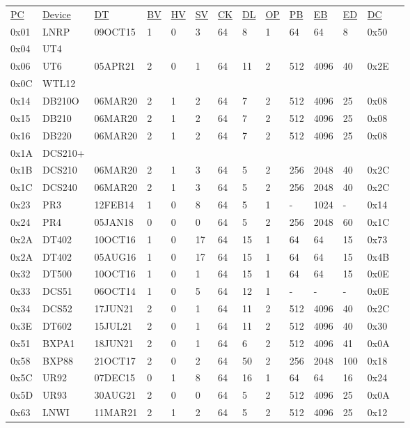 \begin{tabular}{l l l l l l l l l l l l l l}
\underline{PC} & \underline{Device} & \underline{DT} & \underline{BV} & \underline{HV} & \underline{SV} & \underline{CK} & \underline{DL} & \underline{OP} & \underline{PB} & \underline{EB} & \underline{ED} & \underline{DC}\\
0x01 & LNRP & 09OCT15 & 1 & 0 & 3 & 64 & 8 & 1 & 64 & 64 & 8 & 0x50\\
0x04 & UT4\\
0x06 & UT6 & 05APR21 & 2 & 0 & 1 & 64 & 11 & 2 & 512 & 4096 & 40 & 0x2E\\
0x0C & WTL12\\
0x14 & DB210O & 06MAR20 & 2 & 1 & 2 & 64 & 7 & 2 & 512 & 4096 & 25 & 0x08\\
0x15 & DB210 & 06MAR20& 2 & 1 & 2 & 64 & 7 & 2 & 512 & 4096 & 25 & 0x08\\
0x16 & DB220 & 06MAR20 & 2 & 1 & 2 & 64 & 7 & 2 & 512 & 4096 & 25 & 0x08\\
0x1A & DCS210+\\
0x1B & DCS210 & 06MAR20 & 2 & 1 & 3 & 64 & 5 & 2 & 256 & 2048 & 40 & 0x2C\\
0x1C & DCS240 & 06MAR20 & 2 & 1 & 3 & 64 & 5 & 2 & 256 & 2048 & 40 & 0x2C\\
0x23 & PR3 & 12FEB14 & 1 & 0 & 8 & 64 & 5 & 1 & - & 1024 & - & 0x14\\
0x24 & PR4 & 05JAN18 & 0 & 0 & 0 & 64 & 5 & 2 & 256 & 2048 & 60 & 0x1C\\
0x2A & DT402 & 10OCT16 & 1 & 0 & 17 & 64 & 15 & 1 & 64 & 64 & 15 & 0x73\\
0x2A & DT402 & 05AUG16 & 1 & 0 & 17 & 64 & 15 & 1 & 64 & 64 & 15 & 0x4B\\
0x32 & DT500 & 10OCT16 & 1 & 0 & 1 & 64 & 15 & 1 & 64 & 64 & 15 & 0x0E\\
0x33 & DCS51 & 06OCT14 & 1 & 0 & 5 & 64 & 12 & 1 & - & - & - & 0x0E\\
0x34 & DCS52 & 17JUN21 & 2 & 0 & 1 & 64 & 11 & 2 & 512 & 4096 & 40 & 0x2C\\
0x3E & DT602 & 15JUL21 & 2 & 0 & 1 & 64 & 11 & 2 & 512 & 4096 & 40 & 0x30\\
0x51 & BXPA1 & 18JUN21 & 2 & 0 & 1 & 64 & 6 & 2 & 512 & 4096 & 41 & 0x0A\\
0x58 & BXP88 & 21OCT17 & 2 & 0 & 2 & 64 & 50 & 2 & 256 & 2048 & 100 & 0x18\\
0x5C & UR92 & 07DEC15 & 0 & 1 & 8 & 64 & 16 & 1 & 64 & 64 & 16 & 0x24\\
0x5D & UR93 & 30AUG21 & 2 & 0 & 0 & 64 & 5 & 2 & 512 & 4096 & 25 & 0x0A\\
0x63 & LNWI & 11MAR21 & 2 & 1 & 2 & 64 & 5 & 2 & 512 & 4096 & 25 & 0x12\\
\end{tabular}

